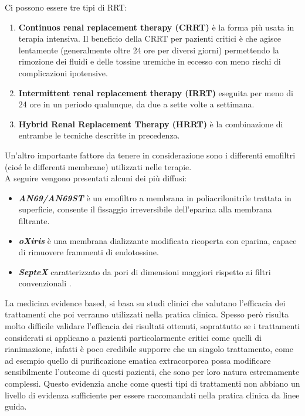 Ci possono essere tre tipi di RRT:
\begin{enumerate}
	\item \textbf{Continuos renal replacement therapy (CRRT)}  è la forma  più usata in terapia intensiva. Il beneficio della CRRT per pazienti critici è che agisce lentamente (generalmente oltre 24 ore per diversi giorni) permettendo la rimozione dei fluidi e delle tossine uremiche in eccesso con meno rischi di complicazioni ipotensive\cite{karkar2019continuous}.
	\item \textbf{Intermittent renal replacement therapy (IRRT)}  eseguita per meno di 24 ore in un periodo qualunque, da due a sette volte a settimana\cite{rabindranath2007intermittent}.
	\item \textbf{Hybrid Renal Replacement Therapy  (HRRT)}  è la combinazione di entrambe le tecniche descritte in precedenza.
\end{enumerate}
Un'altro importante fattore da tenere in considerazione sono i differenti emofiltri (cioé le differenti membrane) utilizzati nelle terapie. \\
A seguire vengono presentati alcuni dei più diffusi:
\begin{itemize}
	\item \textit{\textbf{AN69/AN69ST}} è un emofiltro a membrana in poliacrilonitrile trattata in superficie, consente il fissaggio irreversibile dell'eparina alla membrana filtrante\cite{doi2017associations}. 
	
	\item \textit{\textbf{oXiris}} è una membrana dializzante modificata ricoperta con eparina, capace di rimuovere frammenti di endotossine\cite{turani2019continuous}.
	
	\item \textit{\textbf{SepteX}} caratterizzato da pori di dimensioni maggiori rispetto ai filtri convenzionali \cite{honore2013newly}.
	
\end{itemize}


La medicina evidence based, si basa su studi clinici che valutano l'efficacia dei trattamenti che poi verranno utilizzati nella pratica clinica. Spesso però risulta molto difficile validare l'efficacia dei risultati ottenuti, soprattutto se i trattamenti considerati si applicano a pazienti particolarmente critici come quelli di rianimazione, infatti è poco credibile supporre che un singolo trattamento, come ad esempio quello di purificazione ematica extracorporea possa modificare sensibilmente l'outcome di questi pazienti, che sono per loro natura estremamente complessi. 
Questo evidenzia anche come questi tipi di trattamenti non abbiano un livello di evidenza sufficiente per essere raccomandati nella pratica clinica da linee guida.

